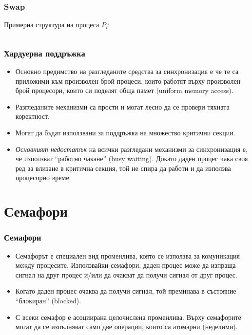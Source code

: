 \documentclass[ignorenonframetext, hyperref=unicode]{beamer}
\begin{document}
\begin{frame}[containsverbatim]
\frametitle{Swap}
Примерна структура на процеса $P_i$:
\begin{columns}
\end{columns}
\end{frame}

\begin{frame}[containsverbatim]
\frametitle{Хардуерна поддръжка}
\begin{itemize}
\item Основно предимство на разгледаните средства за синхронизация е че те са
приложими към произволен брой процеси, които работят върху произволен брой
процесори, които си поделят обща памет (uniform memory access).
\item Разгледаните механизми са прости и могат лесно да се провери тяхната
коректност.
\item Могат да бъдат използвани за поддръжка на множество критични
секции.
\item {\em Основният недостатък} на всички разгледани механизми за синхронизация
е, че използват ``работно чакане'' (busy waiting). Докато даден процес чака своя ред
за влизане в критична секция, той не спира да работи и да използва процесорно
време.
\end{itemize}
\end{frame}


\section{Семафори}

\begin{frame}[containsverbatim]
\frametitle{Семафори}
\begin{itemize}
\item Семафорът е специален вид променлива, която се използва за комуникация
между процесите. Използвайки семафори, даден процес може да изпраща
сигнал на друг процес и/или да очакват да получи сигнал от друг процес.
\item Когато даден процес очаква да получи сигнал, той преминава в състояние
``блокиран'' (blocked).
\item С всеки семафор е асоциирана целочислена променлива. Върху семафорите
могат да се изпълняват само две операции, които са атомарни (неделими).
\end{itemize}
\end{frame}
\end{document}
